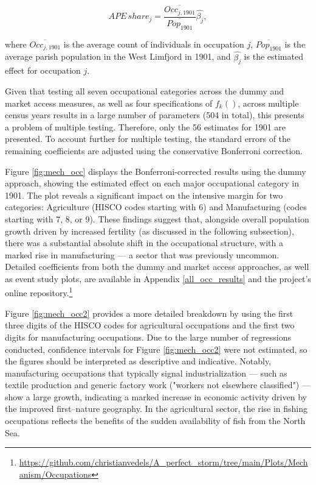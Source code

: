 \documentclass[12pt]{article}
\begin{document}
\begin{equation}
    \label{eq:ape_share}
    APE\,share_j = \frac{\overline{Occ_{j, 1901}}}{\overline{Pop_{1901}}} \hat{\beta_j},
\end{equation}

\noindent
where $\overline{Occ_{j, 1901}}$ is the average count of individuals in occupation $j$, $\overline{Pop_{1901}}$ is the average parish population in the West Limfjord in 1901, and $\hat{\beta_j}$ is the estimated effect for occupation $j$.

Given that testing all seven occupational categories across the dummy and market access measures, as well as four specifications of $f_k()$, across multiple census years results in a large number of parameters (504 in total), this presents a problem of multiple testing. Therefore, only the 56 estimates for 1901 are presented. To account further for multiple testing, the standard errors of the remaining coefficients are adjusted using the conservative Bonferroni correction.

Figure \ref{fig:mech_occ} displays the Bonferroni-corrected results using the dummy approach, showing the estimated effect on each major occupational category in 1901. The plot reveals a significant impact on the intensive margin for two categories: Agriculture (HISCO codes starting with 6) and Manufacturing (codes starting with 7, 8, or 9). These findings suggest that, alongside overall population growth driven by increased fertility (as discussed in the following subsection), there was a substantial absolute shift in the occupational structure, with a marked rise in manufacturing — a sector that was previously uncommon. Detailed coefficients from both the dummy and market access approaches, as well as event study plots, are available in Appendix \ref{all_occ_results} and the project's online repository.\footnote{\url{https://github.com/christianvedels/A_perfect_storm/tree/main/Plots/Mechanism/Occupations}}

Figure \ref{fig:mech_occ2} provides a more detailed breakdown by using the first three digits of the HISCO codes for agricultural occupations and the first two digits for manufacturing occupations. Due to the large number of regressions conducted, confidence intervals for Figure \ref{fig:mech_occ2} were not estimated, so the figures should be interpreted as descriptive and indicative. Notably, manufacturing occupations that typically signal industrialization — such as textile production and generic factory work ("workers not elsewhere classified") — show a large growth, indicating a marked increase in economic activity driven by the improved first–nature geography. In the agricultural sector, the rise in fishing occupations reflects the benefits of the sudden availability of fish from the North Sea. 
\end{document}
